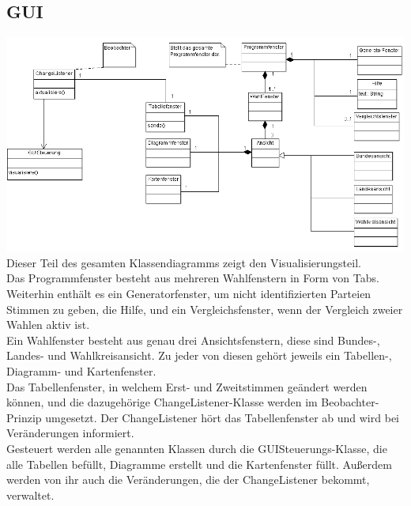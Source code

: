 \documentclass[10pt,a4paper]{article}
\begin{document}
\subsection{GUI}
\includegraphics[scale=0.6]{GUI-Abschnitt.png} \\
Dieser Teil des gesamten Klassendiagramms zeigt den Visualisierungsteil. \\
Das Programmfenster besteht aus mehreren Wahlfenstern in Form von Tabs. Weiterhin enthält es
ein Generatorfenster, um nicht identifizierten Parteien Stimmen zu geben, die Hilfe, und
ein Vergleichsfenster, wenn der Vergleich zweier Wahlen aktiv ist. \\
Ein Wahlfenster besteht aus genau drei Ansichtsfenstern, diese sind Bundes-, Landes- und
Wahlkreisansicht.
Zu jeder von diesen gehört jeweils ein Tabellen-, Diagramm- und Kartenfenster. \\
Das Tabellenfenster, in welchem Erst- und Zweitstimmen geändert werden können, und die
dazugehörige ChangeListener-Klasse werden im Beobachter-Prinzip umgesetzt. Der ChangeListener
hört das Tabellenfenster ab und wird bei Veränderungen informiert. \\
Gesteuert werden alle genannten Klassen durch die GUISteuerungs-Klasse, die alle Tabellen befüllt,
Diagramme erstellt und die Kartenfenster füllt. Außerdem werden von ihr auch die Veränderungen,
die der ChangeListener bekommt, verwaltet.
\end{document}
